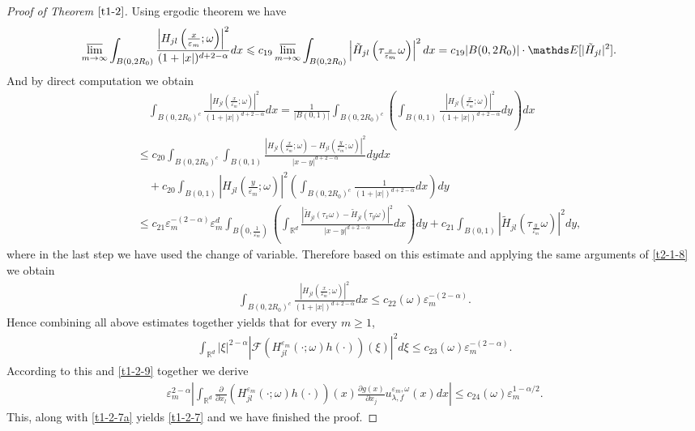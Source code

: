 \documentclass[11pt,draft, reqno]{amsart}
\renewcommand{\le}{\leqslant}
\renewcommand{\ge}{\geqslant}
\newcommand{\F}{\mathscr{F}}
\newcommand{\R}{\mathds R}
\newcommand{\e}{\varepsilon}
\newcommand{\Ee}{\mathds E}
\newcommand{\w}{\omega}
\theoremstyle{definition}
\numberwithin{equation}{section}
\begin{document}
\begin{proof} [Proof of Theorem $\ref{t1-2}$]
Using ergodic theorem we have
\begin{align*}
\varlimsup_{m \to \infty}\int_{B(0,2R_0)}\frac{\left|H_{jl}\left(\frac{x}{\e_m};\w\right)\right|^2}{(1+|x|)^{d+2-\alpha}}dx
&\le c_{19}\varlimsup_{m \to \infty}\int_{B(0,2R_0)}\left|\tilde H_{jl}\left(\tau_{\frac{x}{\e_m}}\w\right)\right|^2dx
=c_{19}|B(0,2R_0)|\cdot\Ee[|\tilde H_{jl}|^2].
\end{align*}
And by direct computation we obtain
\begin{align*}
&\quad \int_{B(0,2R_0)^c}\frac{\left|H_{jl}\left(\frac{x}{\e_m};\w\right)\right|^2}{(1+|x|)^{d+2-\alpha}}dx
=\frac{1}{|B(0,1)|}\int_{B(0,2R_0)^c}\left(\int_{B(0,1)}\frac{\left|H_{jl}\left(\frac{x}{\e_m};\w\right)\right|^2}{(1+|x|)^{d+2-\alpha}}dy\right)dx\\
&\le c_{20}\int_{B(0,2R_0)^c}\int_{B(0,1)}\frac{\left|H_{jl}\left(\frac{x}{\e_m};\w\right)-H_{jl}\left(\frac{y}{\e_m};\w\right)\right|^2}{|x-y|^{d+2-\alpha}}dydx\\
&\quad +c_{20}\int_{B(0,1)}\left|H_{jl}\left(\frac{y}{\e_m};\w\right)\right|^2
\left(\int_{B(0,2R_0)^c}\frac{1}{(1+|x|)^{d+2-\alpha}}dx\right)dy\\
&\le c_{21}\e_m^{-(2-\alpha)}\e_m^d\int_{B\left(0,\frac{1}{\e_m}\right)}
\left(\int_{\R^d}\frac{\left|\tilde H_{jl}(\tau_{x}\w)-\tilde H_{jl}(\tau_{y}\w)\right|^2}{|x-y|^{d+2-\alpha}}dx\right)dy
+c_{21}\int_{B(0,1)}\left|\tilde H_{jl}\left(\tau_{\frac{y}{\e_m}}\w\right)\right|^2dy,
\end{align*}
where in the last step we have used the change of variable.
Therefore based on this estimate and applying the same arguments of \eqref{t2-1-8} we obtain
\begin{align*}
\int_{B(0,2R_0)^c}\frac{\left|H_{jl}\left(\frac{x}{\e_m};\w\right)\right|^2}{(1+|x|)^{d+2-\alpha}}dx
\le c_{22}(\w)\e_m^{-(2-\alpha)}.
\end{align*}
Hence combining all above estimates together yields that for every $m\ge 1$,
\begin{align*}
\int_{\R^d}|\xi|^{2-\alpha}\left|\F\left(H_{jl}^{\e_m}(\cdot;\w)h(\cdot)\right)(\xi)\right|^2d\xi
\le c_{23}(\w)\e_m^{-(2-\alpha)}.
\end{align*}
According to  this and \eqref{t1-2-9} together we derive
\begin{align*}
\e_m^{2-\alpha}\left|\int_{\R^d}\frac{\partial}{\partial x_l}\left( H_{jl}^{\e_m}\left(\cdot;\w\right)h(\cdot)\right)(x)
\frac{\partial g(x)}{\partial x_j}u_{\lambda,f}^{\e_m,\w}(x)dx\right|\le c_{24}(\w)\e_m^{1-\alpha/2}.
\end{align*}
This, along with \eqref{t1-2-7a} yields \eqref{t1-2-7} and we have finished the proof.

\end{proof}
\end{document}

